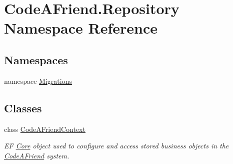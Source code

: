 \hypertarget{namespace_code_a_friend_1_1_repository}{}\section{Code\+A\+Friend.\+Repository Namespace Reference}
\label{namespace_code_a_friend_1_1_repository}
\subsection*{Namespaces}
\begin{DoxyCompactItemize}
\item 
namespace \mbox{\hyperlink{namespace_code_a_friend_1_1_repository_1_1_migrations}{Migrations}}
\end{DoxyCompactItemize}
\subsection*{Classes}
\begin{DoxyCompactItemize}
\item 
class \mbox{\hyperlink{class_code_a_friend_1_1_repository_1_1_code_a_friend_context}{Code\+A\+Friend\+Context}}
\begin{DoxyCompactList}\small\item\em EF \mbox{\hyperlink{namespace_code_a_friend_1_1_core}{Core}} object used to configure and access stored business objects in the \mbox{\hyperlink{namespace_code_a_friend}{Code\+A\+Friend}} system.\end{DoxyCompactList}\end{DoxyCompactItemize}
